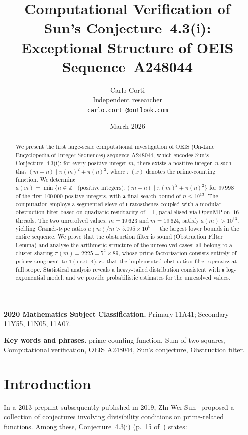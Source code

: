 \documentclass[11pt]{article}
\title{Computational Verification of Sun's Conjecture~4.3(i):\\
Exceptional Structure of OEIS Sequence~A248044}
\author{Carlo Corti\\
Independent researcher\\
\texttt{carlo.corti@outlook.com}}
\date{March 2026}
\theoremstyle{definition}
\theoremstyle{remark}
\numberwithin{equation}{section}
\newcommand{\Zp}{\mathbb{Z}^{+}}
\begin{document}
\maketitle

\begin{abstract}
We present the first large-scale computational investigation of
OEIS (On-Line Encyclopedia of Integer Sequences) sequence A248044,
which encodes Sun's Conjecture~4.3(i):
for every positive integer $m$, there exists a positive integer~$n$
such that $(m+n) \mid \pi(m)^2 + \pi(n)^2$, where $\pi(x)$ denotes
the prime-counting function.
We determine $a(m) = \min\{n \in \Zp \text{ (positive integers)} : (m+n) \mid \pi(m)^2 + \pi(n)^2\}$
for $99\,998$ of the first $100\,000$ positive integers, with a
final search bound of $n \le 10^{13}$.
The computation employs a segmented sieve of Eratosthenes coupled
with a modular obstruction filter based on quadratic residuacity of~$-1$,
parallelised via OpenMP on~$16$ threads.
The two unresolved values, $m = 19\,623$ and $m = 19\,624$, satisfy
$a(m) > 10^{13}$, yielding Cram\'er-type ratios
$a(m)/m > 5.095 \times 10^8$ --- the largest lower bounds in the
entire sequence.
We prove that the obstruction filter is sound
(Obstruction Filter Lemma) and analyse the arithmetic
structure of the unresolved cases: all belong to a cluster sharing
$\pi(m) = 2225 = 5^2 \times 89$, whose prime factorisation consists
entirely of primes congruent to $1 \pmod{4}$, so that the
implemented obstruction filter operates at full scope.
Statistical analysis reveals a heavy-tailed distribution
consistent with a log-exponential model, and we provide
probabilistic estimates for the unresolved values.
\end{abstract}

\noindent\textbf{2020 Mathematics Subject Classification.}
Primary 11A41; Secondary 11Y55, 11N05, 11A07.

\noindent\textbf{Key words and phrases.}
prime counting function, Sum of two squares,
Computational verification, OEIS A248044, Sun's conjecture,
Obstruction filter.

\section{Introduction}
\label{sec:intro}

In a 2013 preprint subsequently published in 2019,
Zhi-Wei Sun~\cite{Sun2019} proposed a collection of conjectures
involving divisibility conditions on prime-related functions.
Among these, Conjecture~4.3(i) (p.~15 of~\cite{Sun2019}) states:
\end{document}
